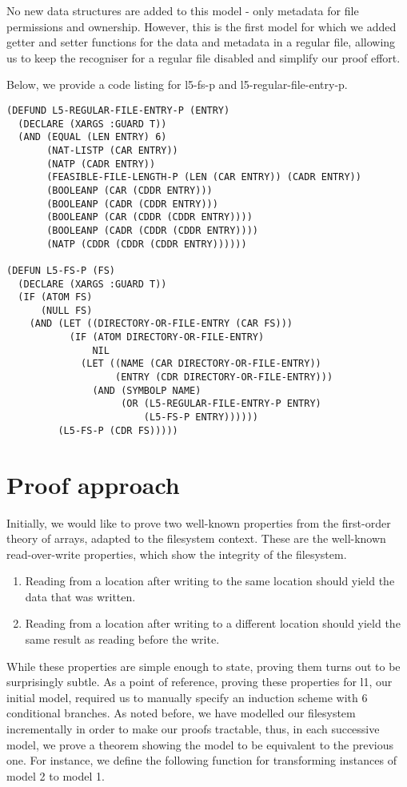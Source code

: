 \documentclass[format=sigconf,review=true]{acmart}
\begin{document}
No new data structures are added to this model - only metadata for
file permissions and ownership. However, this is the first model for
which we added getter and setter functions for the data and metadata
in a regular file, allowing us to keep the recogniser for a regular
file disabled and simplify our proof effort.

Below, we provide a code listing for l5-fs-p and
l5-regular-file-entry-p.

\begin{lstlisting}
(DEFUND L5-REGULAR-FILE-ENTRY-P (ENTRY)
  (DECLARE (XARGS :GUARD T))
  (AND (EQUAL (LEN ENTRY) 6)
       (NAT-LISTP (CAR ENTRY))
       (NATP (CADR ENTRY))
       (FEASIBLE-FILE-LENGTH-P (LEN (CAR ENTRY)) (CADR ENTRY))
       (BOOLEANP (CAR (CDDR ENTRY)))
       (BOOLEANP (CADR (CDDR ENTRY)))
       (BOOLEANP (CAR (CDDR (CDDR ENTRY))))
       (BOOLEANP (CADR (CDDR (CDDR ENTRY))))
       (NATP (CDDR (CDDR (CDDR ENTRY))))))

(DEFUN L5-FS-P (FS)
  (DECLARE (XARGS :GUARD T))
  (IF (ATOM FS)
      (NULL FS)
    (AND (LET ((DIRECTORY-OR-FILE-ENTRY (CAR FS)))
           (IF (ATOM DIRECTORY-OR-FILE-ENTRY)
               NIL
             (LET ((NAME (CAR DIRECTORY-OR-FILE-ENTRY))
                   (ENTRY (CDR DIRECTORY-OR-FILE-ENTRY)))
               (AND (SYMBOLP NAME)
                    (OR (L5-REGULAR-FILE-ENTRY-P ENTRY)
                        (L5-FS-P ENTRY))))))
         (L5-FS-P (CDR FS)))))
\end{lstlisting}

\section {Proof approach}

Initially, we would like to prove two well-known properties from the
first-order theory of arrays, adapted to the filesystem context. These
are the well-known read-over-write properties, which show the
integrity of the filesystem.

\begin {enumerate}
\item Reading from a location after writing to the same location
  should yield the data that was written.
\item Reading from a location after writing to a different
  location should yield the same result as reading before the write.
\end {enumerate}

While these properties are simple enough to state, proving them turns
out to be surprisingly subtle. As a point of reference, proving these
properties for l1, our initial model, required us to manually specify
an induction scheme with 6 conditional branches. As noted
before, we have modelled our filesystem incrementally in order to make
our proofs tractable, thus, in each successive model, we prove a
theorem showing the model to be equivalent to the previous one. For
instance, we define the following function for transforming
instances of model 2 to model 1.
\end{document}
